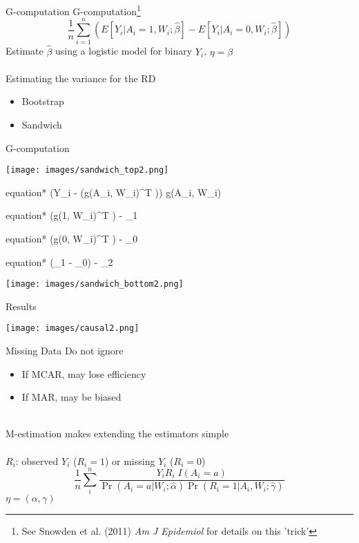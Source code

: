 \documentclass{beamer}
\begin{document}
\begin{frame}{G-computation}
	G-computation\footnote[frame]{See Snowden et al. (2011) \textit{Am J Epidemiol} for details on this 'trick'}
	\[\frac{1}{n} \sum_{i=1}^n \left(E[Y_i | A_i=1, W_i; \hat{\beta}] -  E[Y_i | A_i=0, W_i; \hat{\beta}]\right)\]
	Estimate $\hat{\beta}$ using a logistic model for binary $Y_i$, $\eta = \beta$
	\\~\\
	Estimating the variance for the RD
	\begin{itemize}
		\item Bootstrap
		\item Sandwich
	\end{itemize}
\end{frame}

\begin{frame}{G-computation}
	\begin{center}
		\texttt{[image: images/sandwich\_top2.png]}
		\begin{empheq}[box=\rbox]{equation*}
			\left(Y_i - (g(A_i, W_i)^T \hat{\beta})\right) g(A_i, W_i)
		\end{empheq}
		\begin{empheq}[box=\wbox]{equation*}
			(g(1, W_i)^T \hat{\beta}) - \hat{\mu}_1
		\end{empheq}
		\begin{empheq}[box=\wbox]{equation*}
			(g(0, W_i)^T \hat{\beta}) - \hat{\mu}_0
		\end{empheq}
		\begin{empheq}[box=\wbox]{equation*}
			(\hat{\mu}_1 - \hat{\mu}_0) - \hat{\mu}_2
		\end{empheq}
		\texttt{[image: images/sandwich\_bottom2.png]}
	\end{center}
\end{frame}

\begin{frame}{Results}
	\begin{center}
		\texttt{[image: images/causal2.png]}
	\end{center}
\end{frame}

\begin{frame}{Missing Data}
	Do not ignore
	\begin{itemize}
		\item If MCAR, may lose efficiency
		\item If MAR, may be biased
	\end{itemize}~\\
	M-estimation makes extending the estimators simple\\~\\
	$R_i$: observed $Y_i$ ($R_i = 1$) or missing $Y_i$ ($R_i = 0$)
	\[\frac{1}{n} \sum_i^n \frac{Y_i R_i \; I(A_i=a)}{\Pr(A_i=a | W_i ; \hat{\alpha})\Pr(R_i=1 | A_i,W_i ; \hat{\gamma})}\]
	$\eta = (\alpha, \gamma)$
\end{frame}
\end{document}
